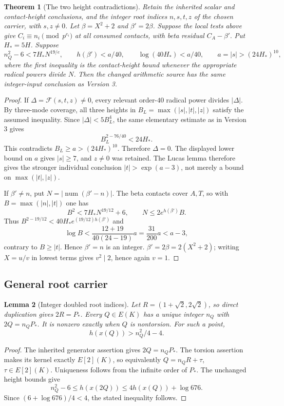 \documentclass[11pt]{article}
\newtheorem{theorem}{Theorem}[section]
\newtheorem{lemma}[theorem]{Lemma}
\theoremstyle{definition}
\theoremstyle{remark}
\begin{document}
\begin{theorem}[The two height contradictions]
\label{thm:quartic-selective-arithmetic}
Retain the inherited scalar and contact-height conclusions, and the integer
root indices $n,s,t,z$ of the chosen carrier, with $s,z\ne0$. Let
$\beta=X^2+2$ and $\beta'=2\beta$. Suppose the
local tests above give $C_i\equiv n_i\pmod{p^{e_i}}$ at all consumed
contacts, with beta residual $C_A-\beta'$. Put $H_*=5H$. Suppose
\[
 n_Q^2-6<7H_*N^{19/e},\qquad
 h(\beta')<a/40,\qquad \log(40H_*)<a/40,
 \qquad a=|s|>(24H_*)^{10},
\]
where the first inequality is the contact-height bound whenever the
appropriate radical powers divide $N$. Then the changed arithmetic source
has the same integer-input conclusion as Version 3.
\end{theorem}
\begin{proof}
If $\Delta=\mathcal F(s,t,z)\ne0$, every relevant order-$40$ radical
power divides $|\Delta|$. By three-mode coverage, all three heights in
$B_L=\max(|s|,|t|,|z|)$ satisfy the assumed inequality. Since
$|\Delta|<5B_L^4$, the same elementary estimate as in Version 3 gives
\[
 B_L^{2-76/40}<24H_*.
\]
This contradicts $B_L\ge a>(24H_*)^{10}$. Therefore $\Delta=0$.
The displayed lower bound on $a$ gives $|s|\ge7$, and $z\ne0$ was
retained. The Lucas lemma therefore gives the stronger individual conclusion
$|t|>\exp(a-3)$, not merely a bound on $\max(|t|,|z|)$.

If $\beta'\ne n$, put $N=|\operatorname{num}(\beta'-n)|$.
The beta contacts cover $A,T$, so with $B=\max(|n|,|t|)$ one has
\[
 B^2<7H_*N^{19/12}+6,\qquad
 N\le2e^{h(\beta')}B.
\]
Thus $B^{2-19/12}<40H_*e^{(19/12)h(\beta')}$ and
\[
 \log B<\frac{12+19}{40(24-19)}a=\frac{31}{200}a<a-3,
\]
contrary to $B\ge|t|$. Hence $\beta'=n$ is an integer. $\beta'=2\beta=2(X^2+2)$;
writing $X=u/v$ in lowest terms gives $v^2\mid2$, hence again $v=1$.
\end{proof}


\subsection{General root carrier}
\label{sec:quartic-general-root-variant}

\begin{lemma}[Integer doubled root indices]
\label{lem:quartic-doubled-indices}
Let $R=(1+\sqrt2,2\sqrt2)$, so direct duplication gives $2R=P_*$.
Every $Q\in E(K)$ has a unique integer $n_Q$ with $2Q=n_QP_*$.
It is nonzero exactly when $Q$ is nontorsion. For such a point,
\[
 h(x(Q))>n_Q^2/4-4.
\]
\end{lemma}
\begin{proof}
The inherited generator assertion gives $2Q=n_QP_*$. The torsion
assertion makes its kernel exactly $E[2](K)$, so equivalently
$Q=n_QR+\tau$, $\tau\in E[2](K)$. Uniqueness follows from the infinite
order of $P_*$. The unchanged height bounds give
\[
 n_Q^2-6\le h(x(2Q))\le4h(x(Q))+\log676.
\]
Since $(6+\log676)/4<4$, the stated inequality follows.
\end{proof}
\end{document}
